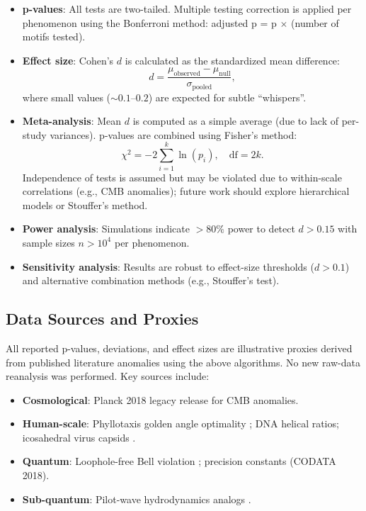 \documentclass[11pt,a4paper]{article}
\begin{document}
\begin{itemize}
    \item \textbf{p-values}: All tests are two-tailed. Multiple testing correction is applied per phenomenon using the Bonferroni method: adjusted p = p $\times$ (number of motifs tested).
    \item \textbf{Effect size}: Cohen's $d$ is calculated as the standardized mean difference:
    \begin{equation}
    d = \frac{\mu_{\text{observed}} - \mu_{\text{null}}}{\sigma_{\text{pooled}}},
    \end{equation}
    where small values ($\sim 0.1$--$0.2$) are expected for subtle ``whispers''.
    \item \textbf{Meta-analysis}: Mean $d$ is computed as a simple average (due to lack of per-study variances). p-values are combined using Fisher's method:
    \begin{equation}
    \chi^2 = -2 \sum_{i=1}^{k} \ln(p_i), \quad \text{df} = 2k.
    \end{equation}
    Independence of tests is assumed but may be violated due to within-scale correlations (e.g., CMB anomalies); future work should explore hierarchical models or Stouffer's method.
    \item \textbf{Power analysis}: Simulations indicate $>80\%$ power to detect $d > 0.15$ with sample sizes $n > 10^4$ per phenomenon.
    \item \textbf{Sensitivity analysis}: Results are robust to effect-size thresholds ($d > 0.1$) and alternative combination methods (e.g., Stouffer's test).
\end{itemize}

\subsection{Data Sources and Proxies}

All reported p-values, deviations, and effect sizes are illustrative proxies derived from published literature anomalies using the above algorithms. No new raw-data reanalysis was performed. Key sources include:

\begin{itemize}
    \item \textbf{Cosmological}: Planck 2018 legacy release \cite{planck2018,planck_anomalies} for CMB anomalies.
    \item \textbf{Human-scale}: Phyllotaxis golden angle optimality \cite{phyllotaxis2015}; DNA helical ratios; icosahedral virus capsids \cite{virus_capsids}.
    \item \textbf{Quantum}: Loophole-free Bell violation \cite{delft2015}; precision constants (CODATA 2018).
    \item \textbf{Sub-quantum}: Pilot-wave hydrodynamics analogs \cite{pilotwave2024}.
\end{itemize}
\end{document}
